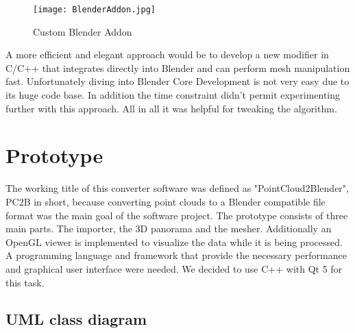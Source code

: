 \begin{figure}[h]
	\centering
	\texttt{[image: BlenderAddon.jpg]}
	\caption{Custom Blender Addon}
	\label{fig:blender_addon}
\end{figure}

A more efficient and elegant approach would be to develop a new modifier in C/C++ that integrates directly into Blender and can perform mesh manipulation fast. Unfortunately diving into Blender Core Development is not very easy due to its huge code base. In addition the time constraint didn't permit experimenting further with this approach. All in all it was helpful for tweaking the algorithm.

\section{Prototype}

The working title of this converter software was defined as "PointCloud2Blender", PC2B in short, because converting point clouds to a Blender compatible file format was the main goal of the software project. The prototype consists of three main parts. The importer, the 3D panorama and the mesher. Additionally an OpenGL viewer is implemented to visualize the data while it is being processed. A programming language and framework that provide the necessary performance and graphical user interface were needed. We decided to use C++ with Qt 5 for this task.

\subsection{UML class diagram}

